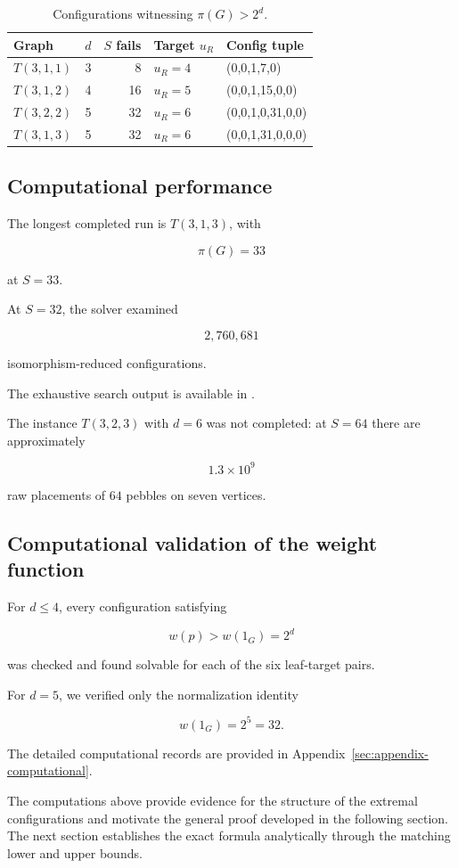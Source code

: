 \begin{table}[ht]
\centering
\caption{Configurations witnessing $\pi(G)>2^d$.}
\label{tab:critical}

\begin{tabular}{lrrll}
\hline
Graph & $d$ & $S$ fails & Target $u_R$ & Config tuple\\
\hline

$T(3,1,1)$
&3&8&$u_R=4$&(0,0,1,7,0)\\

$T(3,1,2)$
&4&16&$u_R=5$&(0,0,1,15,0,0)\\

$T(3,2,2)$
&5&32&$u_R=6$&(0,0,1,0,31,0,0)\\

$T(3,1,3)$
&5&32&$u_R=6$&(0,0,1,31,0,0,0)\\

\hline
\end{tabular}
\end{table}



\subsection{Computational performance}


The longest completed run is $T(3,1,3)$, with

\[
\pi(G)=33
\]

at $S=33$.

At $S=32$, the solver examined

\[
2,760,681
\]

isomorphism-reduced configurations.

The exhaustive search output is available in
.

The instance $T(3,2,3)$ with $d=6$ was not completed:
at $S=64$ there are approximately

\[
1.3\times10^9
\]

raw placements of $64$ pebbles on seven vertices.


\subsection{Computational validation of the weight function}
\label{sec:wf-computational}


For $d\le4$, every configuration satisfying

\[
w(p)>w(1_G)=2^d
\]

was checked and found solvable for each of the six leaf-target pairs.

For $d=5$, we verified only the normalization identity

\[
w(1_G)=2^5=32 .
\]

The detailed computational records are provided in
Appendix~\ref{sec:appendix-computational}.


The computations above provide evidence for the structure of the extremal
configurations and motivate the general proof developed in the following
section. The next section establishes the exact formula analytically through
the matching lower and upper bounds.